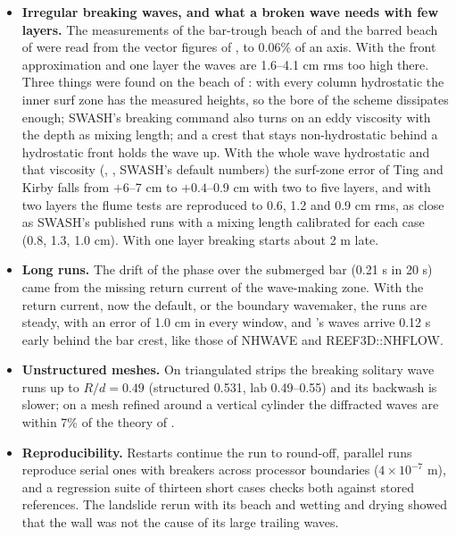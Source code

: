 \begin{itemize}[nosep]
        integrates the velocity profile over the layer instead of taking
        it at mid-depth. In its tutorial with short-crested waves at an
        angle, the undertow seaward of the surf zone is the return of the
        wave mass flux within 6\% and the longshore current reaches
        0.43 m/s, uniform alongshore, but the waves in the surf zone are
        about twice as high for their depth as on measured beaches. One
        layer without friction reproduces the three cases of the conical
        island as three layers with friction do, except for a crest
        behind the island that is 5--9\% higher.
  \item \textbf{Irregular breaking waves, and what a broken wave needs
        with few layers.} The measurements of the bar-trough beach of
        \citet{battjes1978} and the barred beach of \citet{boers1996} were
        read from the vector figures of \citet{zijlema2011}, to 0.06\% of
        an axis. With the front approximation and one layer the waves are
        1.6--4.1 cm rms too high there. Three things were found on the
        beach of \citet{ting1994}: with every column hydrostatic the inner
        surf zone has the measured heights, so the bore of the scheme
        dissipates enough; SWASH's breaking command also turns on an eddy
        viscosity with the depth as mixing length; and a crest that stays
        non-hydrostatic behind a hydrostatic front holds the wave up. With
        the whole wave hydrostatic and that viscosity (, , SWASH's default numbers) the
        surf-zone error of Ting and Kirby falls from $+6$--7 cm to
        $+0.4$--0.9 cm with two to five layers, and with two layers the
        flume tests are reproduced to 0.6, 1.2 and 0.9 cm rms, as close as
        SWASH's published runs with a mixing length calibrated for each
        case (0.8, 1.3, 1.0 cm). With one layer breaking starts about 2 m
        late.
  \item \textbf{Long runs.} The drift of the phase over the submerged bar
        (0.21 s in 20 s) came from the missing return current of the
        wave-making zone. With the return current, now the default, or the
        boundary wavemaker, the runs are steady, with an error of 1.0 cm
        in every window, and \NHFOAM's waves arrive 0.12 s early behind the
        bar crest, like those of NHWAVE and REEF3D::NHFLOW.
  \item \textbf{Unstructured meshes.} On triangulated strips the breaking
        solitary wave runs up to $R/d = 0.49$ (structured 0.531, lab
        0.49--0.55) and its backwash is slower; on a mesh refined around a
        vertical cylinder the diffracted waves are within 7\% of the theory
        of \citet{maccamy1954}.
  \item \textbf{Reproducibility.} Restarts continue the run to round-off,
        parallel runs reproduce serial ones with breakers across processor
        boundaries ($4\times10^{-7}$ m), and a regression suite of thirteen
        short cases checks both against stored references. The landslide
        rerun with its beach and wetting and drying showed that the wall
        was not the cause of its large trailing waves.
\end{itemize}

